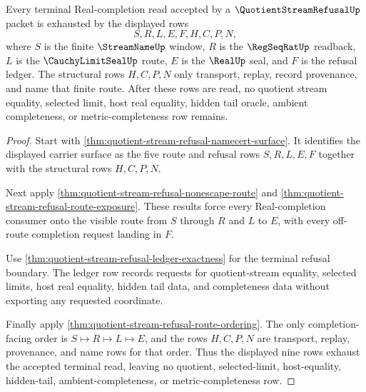 \begin{theorem}
\label{thm:quotient-stream-refusal-terminal-route-exhaustion}
Every terminal Real-completion read accepted by a $\QuotientStreamRefusalUp$ packet is exhausted by the displayed rows
$$
S,R,L,E,F,H,C,P,N,
$$
where $S$ is the finite $\StreamNameUp$ window, $R$ is the $\RegSeqRatUp$ readback, $L$ is the $\CauchyLimitSealUp$ route, $E$ is the $\RealUp$ seal, and $F$ is the refusal ledger. The structural rows $H,C,P,N$ only transport, replay, record provenance, and name that finite route. After these rows are read, no quotient stream equality, selected limit, host real equality, hidden tail oracle, ambient completeness, or metric-completeness row remains.
\end{theorem}
\begin{proof}
Start with \autoref{thm:quotient-stream-refusal-namecert-surface}. It identifies the displayed carrier surface as the five route and refusal rows $S,R,L,E,F$ together with the structural rows $H,C,P,N$.

Next apply \autoref{thm:quotient-stream-refusal-nonescape-route} and \autoref{thm:quotient-stream-refusal-route-exposure}. These results force every Real-completion consumer onto the visible route from $S$ through $R$ and $L$ to $E$, with every off-route completion request landing in $F$.

Use \autoref{thm:quotient-stream-refusal-ledger-exactness} for the terminal refusal boundary. The ledger row records requests for quotient-stream equality, selected limits, host real equality, hidden tail data, and completeness data without exporting any requested coordinate.

Finally apply \autoref{thm:quotient-stream-refusal-route-ordering}. The only completion-facing order is $S \longmapsto R \longmapsto L \longmapsto E$, and the rows $H,C,P,N$ are transport, replay, provenance, and name rows for that order. Thus the displayed nine rows exhaust the accepted terminal read, leaving no quotient, selected-limit, host-equality, hidden-tail, ambient-completeness, or metric-completeness row.
\end{proof}

